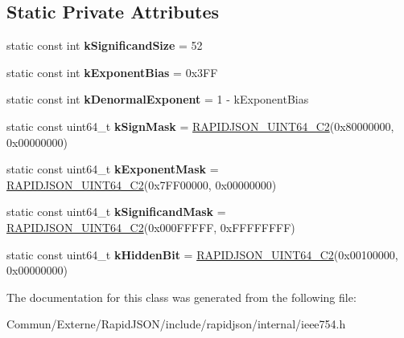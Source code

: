 \subsection*{Static Private Attributes}
\begin{DoxyCompactItemize}
\item 
static const int {\bfseries k\+Significand\+Size} = 52\hypertarget{classinternal_1_1_double_a2e41ff26c6ad85628305c479fbd451aa}{}\label{classinternal_1_1_double_a2e41ff26c6ad85628305c479fbd451aa}

\item 
static const int {\bfseries k\+Exponent\+Bias} = 0x3\+FF\hypertarget{classinternal_1_1_double_a7d4436067abd6620d1ed156b3e9d54e2}{}\label{classinternal_1_1_double_a7d4436067abd6620d1ed156b3e9d54e2}

\item 
static const int {\bfseries k\+Denormal\+Exponent} = 1 -\/ k\+Exponent\+Bias\hypertarget{classinternal_1_1_double_a8e8f5769df7c1a7273d83d61233a682f}{}\label{classinternal_1_1_double_a8e8f5769df7c1a7273d83d61233a682f}

\item 
static const uint64\+\_\+t {\bfseries k\+Sign\+Mask} = \hyperlink{rapidjson_8h_aaee1245f375a71be1ac9b8a07ba5fb8f}{R\+A\+P\+I\+D\+J\+S\+O\+N\+\_\+\+U\+I\+N\+T64\+\_\+\+C2}(0x80000000, 0x00000000)\hypertarget{classinternal_1_1_double_a43d4007b0121278555519de8d4fdc59e}{}\label{classinternal_1_1_double_a43d4007b0121278555519de8d4fdc59e}

\item 
static const uint64\+\_\+t {\bfseries k\+Exponent\+Mask} = \hyperlink{rapidjson_8h_aaee1245f375a71be1ac9b8a07ba5fb8f}{R\+A\+P\+I\+D\+J\+S\+O\+N\+\_\+\+U\+I\+N\+T64\+\_\+\+C2}(0x7\+F\+F00000, 0x00000000)\hypertarget{classinternal_1_1_double_a39172dca75a2a5ddec868a170f7a7a3e}{}\label{classinternal_1_1_double_a39172dca75a2a5ddec868a170f7a7a3e}

\item 
static const uint64\+\_\+t {\bfseries k\+Significand\+Mask} = \hyperlink{rapidjson_8h_aaee1245f375a71be1ac9b8a07ba5fb8f}{R\+A\+P\+I\+D\+J\+S\+O\+N\+\_\+\+U\+I\+N\+T64\+\_\+\+C2}(0x000\+F\+F\+F\+F\+F, 0x\+F\+F\+F\+F\+F\+F\+F\+F)\hypertarget{classinternal_1_1_double_aa34deedf05f755101bf807419d113bf5}{}\label{classinternal_1_1_double_aa34deedf05f755101bf807419d113bf5}

\item 
static const uint64\+\_\+t {\bfseries k\+Hidden\+Bit} = \hyperlink{rapidjson_8h_aaee1245f375a71be1ac9b8a07ba5fb8f}{R\+A\+P\+I\+D\+J\+S\+O\+N\+\_\+\+U\+I\+N\+T64\+\_\+\+C2}(0x00100000, 0x00000000)\hypertarget{classinternal_1_1_double_a93fcf8c6a54766f9239f1d3cb0ca0710}{}\label{classinternal_1_1_double_a93fcf8c6a54766f9239f1d3cb0ca0710}

\end{DoxyCompactItemize}


The documentation for this class was generated from the following file\+:\begin{DoxyCompactItemize}
\item 
Commun/\+Externe/\+Rapid\+J\+S\+O\+N/include/rapidjson/internal/ieee754.\+h\end{DoxyCompactItemize}
